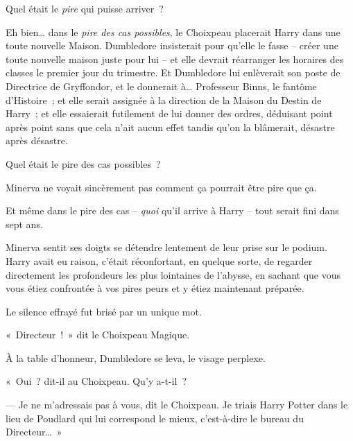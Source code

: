 Quel était le \emph{pire} qui puisse arriver~?

Eh bien… dans le \emph{pire des cas possibles}, le Choixpeau placerait Harry dans une toute nouvelle Maison. Dumbledore insisterait pour qu'elle le fasse -- créer une toute nouvelle maison juste pour lui -- et elle devrait réarranger les horaires des classes le premier jour du trimestre. Et Dumbledore lui enlèverait son poste de Directrice de Gryffondor, et le donnerait à… Professeur Binns, le fantôme d'Histoire~; et elle serait assignée à la direction de la Maison du Destin de Harry~; et elle essaierait futilement de lui donner des ordres, déduisant point après point sans que cela n'ait aucun effet tandis qu'on la blâmerait, désastre après désastre.

Quel était le pire des cas possibles~?

Minerva ne voyait sincèrement pas comment ça pourrait être pire que ça.

Et même dans le pire des cas -- \emph{quoi} qu'il arrive à Harry -- tout serait fini dans sept ans.

Minerva sentit ses doigts se détendre lentement de leur prise sur le podium. Harry avait eu raison, c'était réconfortant, en quelque sorte, de regarder directement les profondeurs les plus lointaines de l'abysse, en sachant que vous vous étiez confrontée à vos pires peurs et y étiez maintenant préparée.

Le silence effrayé fut brisé par un unique mot.

«~Directeur~!~» dit le Choixpeau Magique.

À la table d'honneur, Dumbledore se leva, le visage perplexe.

«~Oui~? dit-il au Choixpeau. Qu'y a-t-il~?

--- Je ne m'adressais pas à vous, dit le Choixpeau. Je triais Harry Potter dans le lieu de Poudlard qui lui correspond le mieux, c'est-à-dire le bureau du Directeur…~»

